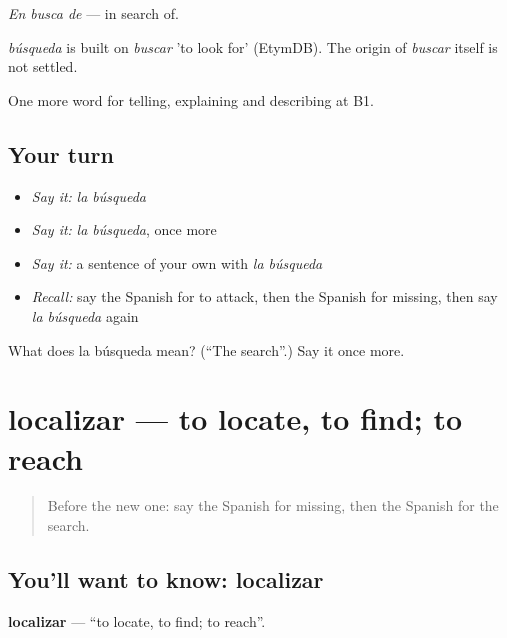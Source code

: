 \emph{En busca de} — in search of.

\begin{cousinweb}
\emph{búsqueda} is built on \emph{buscar} 'to look for' (EtymDB). The origin of \emph{buscar} itself is not settled.
\end{cousinweb}

\begin{grammarlens}[title={What you've built}]
One more word for telling, explaining and describing at B1.
\end{grammarlens}

\subsection*{Your turn}
\begin{itemize}
\raggedright
  \item \emph{Say it:} \emph{la búsqueda}
  \item \emph{Say it:} \emph{la búsqueda}, once more
  \item \emph{Say it:} a sentence of your own with \emph{la búsqueda}
  \item \emph{Recall:} say the Spanish for to attack, then the Spanish for missing, then say \emph{la búsqueda} again
\end{itemize}

\begin{tcolorbox}[breakable,colback=teal!4,colframe=teal!35!black,title={Before you move on}]
What does la búsqueda mean? (\textquotedblleft{}The search\textquotedblright{}.) Say it once more.
\end{tcolorbox}
\section[localizar]{localizar — to locate, to find; to reach}

\label{lesson:ES-C531-localizar}



\begin{quote}
Before the new one: say the Spanish for missing, then the Spanish for the search.
\end{quote}

\subsection*{You'll want to know: localizar}
\textbf{localizar} — \textquotedblleft{}to locate, to find; to reach\textquotedblright{}.

